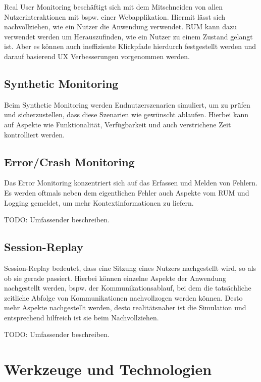 Real User Monitoring beschäftigt sich mit dem Mitschneiden von allen Nutzerinteraktionen mit bspw. einer Webapplikation. Hiermit lässt sich nachvollziehen, wie ein Nutzer die Anwendung verwendet. RUM kann dazu verwendet werden um Herauszufinden, wie ein Nutzer zu einem Zustand gelangt ist. Aber es können auch ineffiziente Klickpfade hierdurch festgestellt werden und darauf basierend UX Verbesserungen vorgenommen werden.

\subsection{Synthetic Monitoring}

Beim Synthetic Monitoring werden Endnutzerszenarien simuliert, um zu prüfen und sicherzustellen, dass diese Szenarien wie gewünscht ablaufen. Hierbei kann auf Aspekte wie Funktionalität, Verfügbarkeit und auch verstrichene Zeit kontrolliert werden.

\subsection{Error/Crash Monitoring}

Das Error Monitoring konzentriert sich auf das Erfassen und Melden von Fehlern. Es werden oftmals neben dem eigentlichen Fehler auch Aspekte vom RUM und Logging gemeldet, um mehr Kontextinformationen zu liefern.

{\color{red}TODO: Umfassender beschreiben.}

\subsection{Session-Replay}

Session-Replay bedeutet, dass eine Sitzung eines Nutzers nachgestellt wird, so als ob sie gerade passiert. Hierbei können einzelne Aspekte der Anwendung nachgestellt werden, bspw. der Kommunikationsablauf, bei dem die tatsächliche zeitliche Abfolge von Kommunikationen nachvollzogen werden können. Desto mehr Aspekte nachgestellt werden, desto realitätsnaher ist die Simulation und entsprechend hilfreich ist sie beim Nachvollziehen.

{\color{red}TODO: Umfassender beschreiben.}

\newpage

\section{Werkzeuge und Technologien}
\label{sec:werkzeuge-und-technologien}

